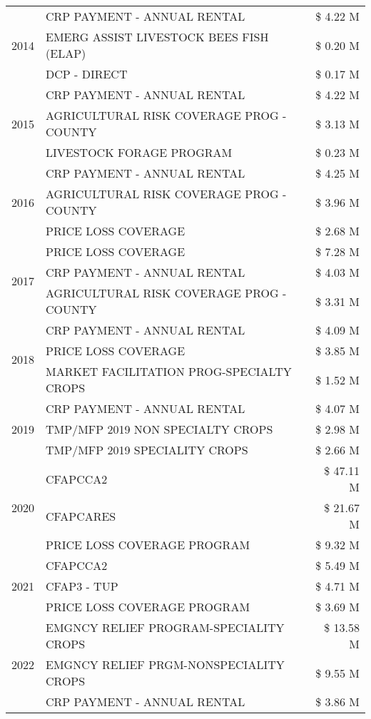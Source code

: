 \begin{tabular}{llr}
\multirow[t]{3}{*}{2014} & CRP PAYMENT - ANNUAL RENTAL & \$ 4.22 M \\
 & EMERG ASSIST LIVESTOCK BEES FISH (ELAP) & \$ 0.20 M \\
 & DCP - DIRECT & \$ 0.17 M \\
\cline{1-3}
\multirow[t]{3}{*}{2015} & CRP PAYMENT - ANNUAL RENTAL & \$ 4.22 M \\
 & AGRICULTURAL RISK COVERAGE PROG - COUNTY & \$ 3.13 M \\
 & LIVESTOCK FORAGE PROGRAM & \$ 0.23 M \\
\cline{1-3}
\multirow[t]{3}{*}{2016} & CRP PAYMENT - ANNUAL RENTAL & \$ 4.25 M \\
 & AGRICULTURAL RISK COVERAGE PROG - COUNTY & \$ 3.96 M \\
 & PRICE LOSS COVERAGE & \$ 2.68 M \\
\cline{1-3}
\multirow[t]{3}{*}{2017} & PRICE LOSS COVERAGE & \$ 7.28 M \\
 & CRP PAYMENT - ANNUAL RENTAL & \$ 4.03 M \\
 & AGRICULTURAL RISK COVERAGE PROG - COUNTY & \$ 3.31 M \\
\cline{1-3}
\multirow[t]{3}{*}{2018} & CRP PAYMENT - ANNUAL RENTAL & \$ 4.09 M \\
 & PRICE LOSS COVERAGE & \$ 3.85 M \\
 & MARKET FACILITATION PROG-SPECIALTY CROPS & \$ 1.52 M \\
\cline{1-3}
\multirow[t]{3}{*}{2019} & CRP PAYMENT - ANNUAL RENTAL & \$ 4.07 M \\
 & TMP/MFP 2019 NON SPECIALTY CROPS & \$ 2.98 M \\
 & TMP/MFP 2019 SPECIALITY CROPS & \$ 2.66 M \\
\cline{1-3}
\multirow[t]{3}{*}{2020} & CFAPCCA2 & \$ 47.11 M \\
 & CFAPCARES & \$ 21.67 M \\
 & PRICE LOSS COVERAGE PROGRAM & \$ 9.32 M \\
\cline{1-3}
\multirow[t]{3}{*}{2021} & CFAPCCA2 & \$ 5.49 M \\
 & CFAP3 - TUP & \$ 4.71 M \\
 & PRICE LOSS COVERAGE PROGRAM & \$ 3.69 M \\
\cline{1-3}
\multirow[t]{3}{*}{2022} & EMGNCY RELIEF PROGRAM-SPECIALITY CROPS & \$ 13.58 M \\
 & EMGNCY RELIEF PRGM-NONSPECIALITY CROPS & \$ 9.55 M \\
 & CRP PAYMENT - ANNUAL RENTAL & \$ 3.86 M \\
\cline{1-3}
\bottomrule
\end{tabular}
